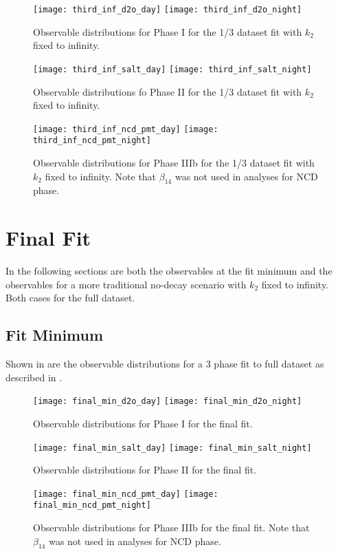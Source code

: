 \begin{figure}
\centering
\texttt{[image: third\_inf\_d2o\_day]}
\texttt{[image: third\_inf\_d2o\_night]}
\caption{\label{fig:third_inf_d2o_obs}Observable distributions for Phase I for the 1/3 dataset fit with $k_2$ fixed to infinity.}
\end{figure}
\begin{figure}
\centering
\texttt{[image: third\_inf\_salt\_day]}
\texttt{[image: third\_inf\_salt\_night]}
\caption{\label{fig:third_inf_salt_obs}Observable distributions fo Phase II for the 1/3 dataset fit with $k_2$ fixed to infinity.}
\end{figure}
\begin{figure}
\centering
\texttt{[image: third\_inf\_ncd\_pmt\_day]}
\texttt{[image: third\_inf\_ncd\_pmt\_night]}
\caption{\label{fig:third_inf_ncd_pmt_obs}Observable distributions for Phase IIIb for the 1/3 dataset fit with $k_2$ fixed to infinity. Note that $\beta_{14}$ was not used in analyses for NCD phase.}
\end{figure}

\clearpage

\section{Final Fit}

\label{final_observables}

In the following sections are both the observables at the fit minimum and the observables for a more traditional no-decay scenario with $k_2$ fixed to infinity. Both cases for the full dataset.

\subsection{Fit Minimum}

Shown in  are the observable distributions for a 3 phase fit to full dataset as described in .

\begin{figure}
\centering
\texttt{[image: final\_min\_d2o\_day]}
\texttt{[image: final\_min\_d2o\_night]}
\caption{\label{fig:final_d2o_obs}Observable distributions for Phase I for the final fit.}
\end{figure}
\begin{figure}
\centering
\texttt{[image: final\_min\_salt\_day]}
\texttt{[image: final\_min\_salt\_night]}
\caption{\label{fig:final_salt_obs}Observable distributions for Phase II for the final fit.}
\end{figure}
\begin{figure}
\centering
\texttt{[image: final\_min\_ncd\_pmt\_day]}
\texttt{[image: final\_min\_ncd\_pmt\_night]}
\caption{\label{fig:final_ncd_pmt_obs}Observable distributions for Phase IIIb for the final fit. Note that $\beta_{14}$ was not used in analyses for NCD phase.}
\end{figure}

